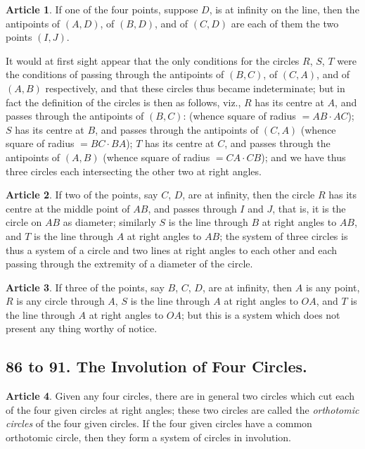 \documentclass[11pt,a4paper]{article}
\theoremstyle{definition}
\newtheorem{art}{Article}
\begin{document}
\begin{art}
If one of the four points, suppose $D$, is at infinity on the line, then the antipoints of $(A, D)$, of $(B, D)$, and of $(C, D)$ are each of them the two points $(I, J)$.

It would at first sight appear that the only conditions for the circles $R$, $S$, $T$ were the conditions of passing through the antipoints of $(B, C)$, of $(C, A)$, and of $(A, B)$ respectively, and that these circles thus became indeterminate; but in fact the definition of the circles is then as follows, viz., $R$ has its centre at $A$, and passes through the antipoints of $(B, C)$: (whence square of radius $= AB \cdot AC$); $S$ has its centre at $B$, and passes through the antipoints of $(C, A)$ (whence square of radius $= BC \cdot BA$); $T$ has its centre at $C$, and passes through the antipoints of $(A, B)$ (whence square of radius $= CA \cdot CB$); and we have thus three circles each intersecting the other two at right angles.
\end{art}

\begin{art}
If two of the points, say $C$, $D$, are at infinity, then the circle $R$ has its centre at the middle point of $AB$, and passes through $I$ and $J$, that is, it is the circle on $AB$ as diameter; similarly $S$ is the line through $B$ at right angles to $AB$, and $T$ is the line through $A$ at right angles to $AB$; the system of three circles is thus a system of a circle and two lines at right angles to each other and each passing through the extremity of a diameter of the circle.
\end{art}

\begin{art}
If three of the points, say $B$, $C$, $D$, are at infinity, then $A$ is any point, $R$ is any circle through $A$, $S$ is the line through $A$ at right angles to $OA$, and $T$ is the line through $A$ at right angles to $OA$; but this is a system which does not present any thing worthy of notice.
\end{art}

\subsection*{86 to 91. The Involution of Four Circles.}

\begin{art}
Given any four circles, there are in general two circles which cut each of the four given circles at right angles; these two circles are called the \textit{orthotomic circles} of the four given circles. If the four given circles have a common orthotomic circle, then they form a system of circles in involution.
\end{art}
\end{document}
